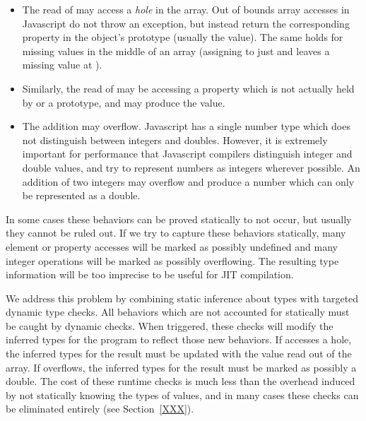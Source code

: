 \begin{itemize}

\item The read of  may access a {\it hole} in the array.
Out of bounds array accesses in Javascript do not throw an exception,
but instead return the corresponding property in the object's prototype
(usually the  value).
The same holds for missing values in the middle of an array
(assigning to just  and  leaves a missing
value at ).

\item Similarly, the read of  may be accessing a property
which is not actually held by  or a prototype, and may produce the
 value.

\item The addition  may overflow.
Javascript has a single number type which does not distinguish between
integers and doubles.
However, it is extremely important for performance that Javascript compilers
distinguish integer and double values, and try to represent numbers as
integers wherever possible.
An addition of two integers may overflow and produce a number which can
only be represented as a double.

\end{itemize}

In some cases these behaviors can be proved statically to not occur,
but usually they cannot be ruled out.
If we try to capture these behaviors statically, many element or property
accesses will be marked as possibly undefined and many integer operations
will be marked as possibly overflowing.
The resulting type information will be too imprecise to be useful for
JIT compilation.

We address this problem by combining static inference about types
with targeted dynamic type checks.
All behaviors which are not accounted for statically must be caught
by dynamic checks.
When triggered, these checks will modify the inferred types
for the program to reflect those new behaviors.
If  accesses a hole, the inferred types for the result must be
updated with the value read out of the array.
If  overflows, the inferred types for the result must be
marked as possibly a double.
The cost of these runtime checks is much less than the overhead induced
by not statically knowing the types of values, and in many cases these
checks can be eliminated entirely (see Section~\ref{XXX}).

